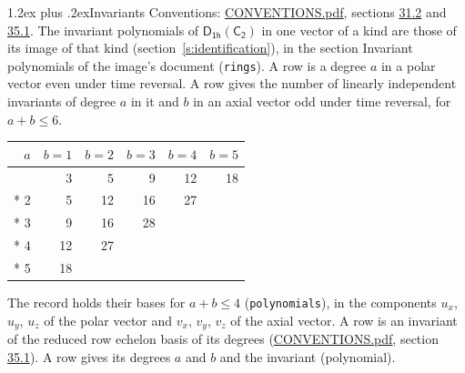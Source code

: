 \documentclass[10pt,a4paper]{article}
\makeatletter
\renewcommand\section{\@startsection{section}{1}{\z@}{-3ex plus -1ex minus -.2ex}%
  {1.2ex plus .2ex}{\normalfont\large\sffamily\bfseries\color{parttitle}}}
\numberwithin{equation}{section}
\newcommand{\grp}[1]{\mathsf{#1}}
\makeatother
\begin{document}
\section{Invariants}\label{s:invariants}
Conventions: \href{../../CONVENTIONS.pdf}{CONVENTIONS.pdf}, sections \href{../../CONVENTIONS.pdf\#conv.31.2}{31.2} and \href{../../CONVENTIONS.pdf\#conv.35.1}{35.1}.
The invariant polynomials of $\grp{D_{1h}}(\grp{C_{2}})$ in one vector of a kind are those of its image of that kind (section~\ref{s:identification}), in the section Invariant polynomials of the image's document (\texttt{rings}).
\leavevmode\label{n:index.degree.polar}\label{n:index.degree.axial}A row is a degree $a$ in a polar vector even under time reversal. A row gives the number of linearly independent invariants of degree $a$ in it and $b$ in an axial vector odd under time reversal, for $a + b \le 6$.
{\small\begin{longtable}{@{}rrrrrr@{}}\toprule
$a$ & $b = 1$ & $b = 2$ & $b = 3$ & $b = 4$ & $b = 5$\\\midrule\endhead
\bottomrule\endfoot\endlastfoot
1 & 3 & 5 & 9 & 12 & 18\\*
2 & 5 & 12 & 16 & 27 & \\*
3 & 9 & 16 & 28 &  & \\*
4 & 12 & 27 &  &  & \\*
5 & 18 &  &  &  & \\
\bottomrule\end{longtable}}
\leavevmode\label{n:local.component.polar}\label{n:local.component.axial}The record holds their bases for $a + b \le 4$ (\texttt{polynomials}), in the components $u_{x}$, $u_{y}$, $u_{z}$ of the polar vector and $v_{x}$, $v_{y}$, $v_{z}$ of the axial vector. \label{n:head.polynomial}A row is an invariant of the reduced row echelon basis of its degrees (\href{../../CONVENTIONS.pdf}{CONVENTIONS.pdf}, section \href{../../CONVENTIONS.pdf\#conv.35.1}{35.1}). A row gives its degrees $a$ and $b$ and the invariant (polynomial).
\end{document}
